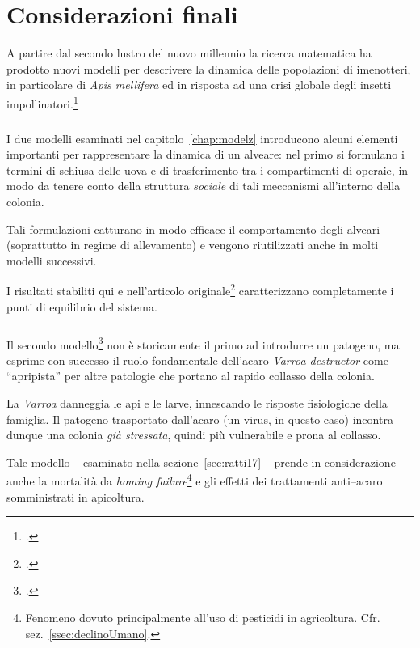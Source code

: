 \chapter{Considerazioni finali}
A partire dal secondo lustro del nuovo millennio la ricerca matematica ha prodotto nuovi modelli per
descrivere la dinamica delle popolazioni di imenotteri, in particolare di \emph{Apis mellifera} ed in risposta
ad una crisi globale degli insetti impollinatori.\footcite{chen_review,decline}

\paragraph{}
I due modelli esaminati nel capitolo~\ref{chap:modelz} introducono alcuni elementi importanti per rappresentare
la dinamica di un alveare: nel primo si formulano i termini di schiusa delle uova e di
trasferimento tra i compartimenti di operaie, in modo da tenere conto della struttura \emph{sociale} di tali meccanismi
all'interno della colonia.

Tali formulazioni catturano in modo efficace il comportamento degli alveari (soprattutto in regime di allevamento)
e vengono riutilizzati anche in molti modelli successivi.

I risultati stabiliti qui e nell'articolo originale\footcite{khoury2011} caratterizzano
completamente i punti di equilibrio del sistema.

\paragraph{}
Il secondo modello\footcite{ratti2017} non è storicamente il primo ad introdurre un patogeno, ma esprime con successo
il ruolo fondamentale dell'acaro \emph{Varroa destructor} come ``apripista'' per altre patologie che portano
al rapido collasso della colonia.

La \emph{Varroa} danneggia le api e le larve, innescando le risposte fisiologiche della famiglia. Il patogeno
trasportato dall'acaro (un virus, in questo caso) incontra dunque una colonia \emph{già stressata},
quindi più vulnerabile e prona al collasso.

Tale modello -- esaminato nella sezione~\ref{sec:ratti17} -- prende in considerazione anche la mortalità da
\emph{homing failure}\footnote{Fenomeno dovuto principalmente all'uso di
pesticidi in agricoltura. Cfr. sez.~\ref{ssec:declinoUmano}.}
e gli effetti dei trattamenti anti--acaro somministrati in apicoltura.

